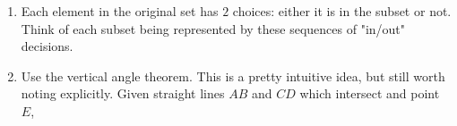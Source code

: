 \begin{enumerate}[label=\textbf{H\arabic*.}]
    \item Each element in the original set has $2$ choices: either it is in the subset or not. Think of each subset being represented by these sequences of "in/out" decisions. 
    \item Use the vertical angle theorem. This is a pretty intuitive idea, but still worth noting explicitly. Given straight lines $AB$ and $CD$ which intersect and point $E$,
    \begin{center}
\end{center}
\end{enumerate}
